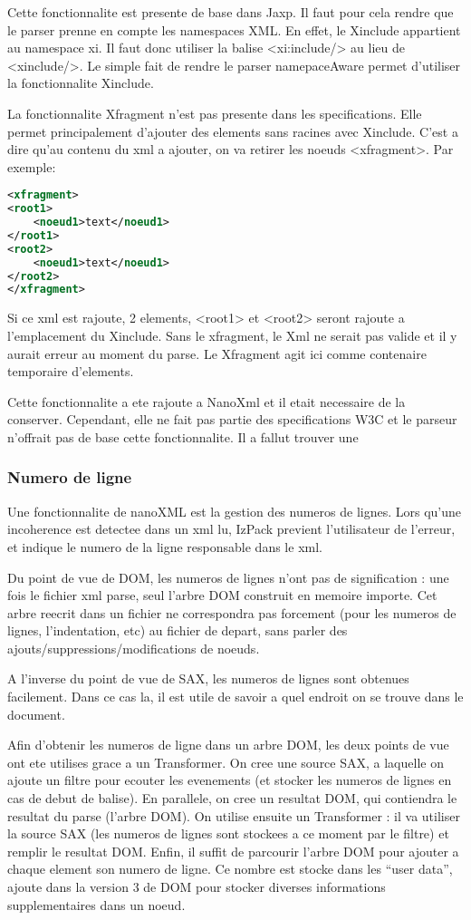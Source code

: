 Cette fonctionnalite est presente de base dans Jaxp. Il faut pour cela rendre que le parser prenne en compte les namespaces XML. En effet, le Xinclude appartient au namespace xi. Il faut donc utiliser la balise <xi:include/> au lieu de <xinclude/>. Le simple fait de rendre le parser namepaceAware permet d'utiliser la fonctionnalite Xinclude. 

La fonctionnalite Xfragment n'est pas presente dans les specifications. Elle permet principalement d'ajouter des elements sans racines avec Xinclude. C'est a dire qu'au contenu du xml a ajouter, on va retirer les noeuds <xfragment>. Par exemple: 
\begin{lstlisting}[language=xml]
<xfragment>
<root1>
	<noeud1>text</noeud1>
</root1>
<root2>
	<noeud1>text</noeud1>
</root2>
</xfragment>
\end{lstlisting}
Si ce xml est rajoute, 2 elements, <root1> et <root2> seront rajoute a l'emplacement du Xinclude. Sans le xfragment, le Xml ne serait pas valide et il y aurait erreur au moment du parse. Le Xfragment agit ici comme contenaire temporaire d'elements.

Cette fonctionnalite a ete rajoute a NanoXml et il etait necessaire de la conserver. Cependant, elle ne fait pas partie des specifications W3C et le parseur n'offrait pas de base cette fonctionnalite. Il a fallut trouver une 


\subsubsection{Numero de ligne}
Une fonctionnalite de nanoXML est la gestion des numeros de lignes. Lors qu'une incoherence est detectee dans un xml lu, IzPack previent l'utilisateur de l'erreur, et indique le numero de la ligne responsable dans le xml.

Du point de vue de DOM, les numeros de lignes n'ont pas de signification : une fois le fichier xml parse, seul l'arbre DOM construit en memoire importe. Cet arbre reecrit dans un fichier ne correspondra pas forcement (pour les numeros de lignes, l'indentation, etc) au fichier de depart, sans parler des ajouts/suppressions/modifications de noeuds.

A l'inverse du point de vue de SAX, les numeros de lignes sont obtenues facilement. Dans ce cas la, il est utile de savoir a quel endroit on se trouve dans le document.

Afin d'obtenir les numeros de ligne dans un arbre DOM, les deux points de vue ont ete utilises grace a un Transformer.
On cree une source SAX, a laquelle on ajoute un filtre pour ecouter les evenements (et stocker les numeros de lignes en cas de debut de balise).
En parallele, on cree un resultat DOM, qui contiendra le resultat du parse (l'arbre DOM).
On utilise ensuite un Transformer : il va utiliser la source SAX (les numeros de lignes sont stockees a ce moment par le filtre) et remplir le resultat DOM.
Enfin, il suffit de parcourir l'arbre DOM pour ajouter a chaque element son numero de ligne.
Ce nombre est stocke dans les ``user data'', ajoute dans la version 3  de DOM pour stocker diverses informations supplementaires dans un noeud.

